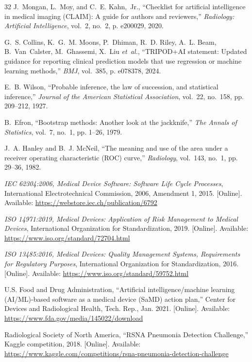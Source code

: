 \documentclass[conference]{IEEEtran}
\begin{document}
\begin{thebibliography}{32}
J.~Mongan, L.~Moy, and C.~E. Kahn,~Jr., ``Checklist for artificial intelligence in medical
imaging ({CLAIM}): A guide for authors and reviewers,'' \emph{Radiology: Artificial
Intelligence}, vol.~2, no.~2, p. e200029, 2020.

G.~S. Collins, K.~G.~M. Moons, P.~Dhiman, R.~D. Riley, A.~L. Beam, B.~Van~Calster,
M.~Ghassemi, X.~Liu \emph{et~al.}, ``{TRIPOD+AI} statement: Updated guidance for reporting
clinical prediction models that use regression or machine learning methods,'' \emph{BMJ},
vol.~385, p. e078378, 2024.

E.~B. Wilson, ``Probable inference, the law of succession, and statistical inference,''
\emph{Journal of the American Statistical Association}, vol.~22, no.~158, pp. 209--212, 1927.

B.~Efron, ``Bootstrap methods: Another look at the jackknife,'' \emph{The Annals of
Statistics}, vol.~7, no.~1, pp. 1--26, 1979.

J.~A. Hanley and B.~J. McNeil, ``The meaning and use of the area under a receiver operating
characteristic ({ROC}) curve,'' \emph{Radiology}, vol.~143, no.~1, pp. 29--36, 1982.

\emph{{IEC} 62304:2006, Medical Device Software: Software Life Cycle Processes}, International
Electrotechnical Commission, 2006, Amendment 1, 2015. [Online]. Available:
\url{https://webstore.iec.ch/publication/6792}

\emph{{ISO} 14971:2019, Medical Devices: Application of Risk Management to Medical Devices},
International Organization for Standardization, 2019. [Online]. Available:
\url{https://www.iso.org/standard/72704.html}

\emph{{ISO} 13485:2016, Medical Devices: Quality Management Systems, Requirements for
Regulatory Purposes}, International Organization for Standardization, 2016. [Online].
Available: \url{https://www.iso.org/standard/59752.html}

U.S. Food and Drug Administration, ``Artificial intelligence/machine learning ({AI/ML})-based
software as a medical device ({SaMD}) action plan,'' Center for Devices and Radiological
Health, Tech. Rep., Jan. 2021. [Online]. Available:
\url{https://www.fda.gov/media/145022/download}

Radiological Society of North America, ``{RSNA} Pneumonia Detection Challenge,'' Kaggle
competition, 2018. [Online]. Available:
\url{https://www.kaggle.com/competitions/rsna-pneumonia-detection-challenge}


\end{thebibliography}
\end{document}
